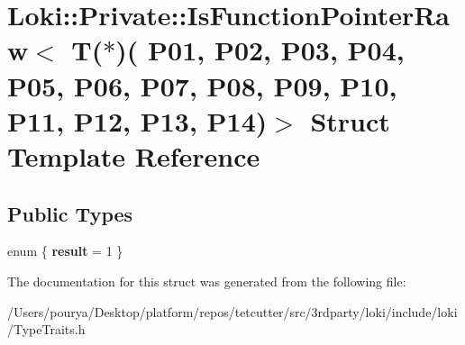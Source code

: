 \hypertarget{structLoki_1_1Private_1_1IsFunctionPointerRaw_3_01T_07_5_08_07_01_01_01_01_01_01_01_01_01_01_01_d261d84dbd35bfc960ef74fa59c629f3}{}\section{Loki\+:\+:Private\+:\+:Is\+Function\+Pointer\+Raw$<$ T($\ast$)( P01, P02, P03, P04, P05, P06, P07, P08, P09, P10, P11, P12, P13, P14)$>$ Struct Template Reference}
\label{structLoki_1_1Private_1_1IsFunctionPointerRaw_3_01T_07_5_08_07_01_01_01_01_01_01_01_01_01_01_01_d261d84dbd35bfc960ef74fa59c629f3}
\subsection*{Public Types}
\begin{DoxyCompactItemize}
\item 
\hypertarget{structLoki_1_1Private_1_1IsFunctionPointerRaw_3_01T_07_5_08_07_01_01_01_01_01_01_01_01_01_01_01_d261d84dbd35bfc960ef74fa59c629f3_a35dfdeb1545c449c3b83f29040bd1046}{}enum \{ {\bfseries result} = 1
 \}\label{structLoki_1_1Private_1_1IsFunctionPointerRaw_3_01T_07_5_08_07_01_01_01_01_01_01_01_01_01_01_01_d261d84dbd35bfc960ef74fa59c629f3_a35dfdeb1545c449c3b83f29040bd1046}

\end{DoxyCompactItemize}


The documentation for this struct was generated from the following file\+:\begin{DoxyCompactItemize}
\item 
/\+Users/pourya/\+Desktop/platform/repos/tetcutter/src/3rdparty/loki/include/loki/Type\+Traits.\+h\end{DoxyCompactItemize}
